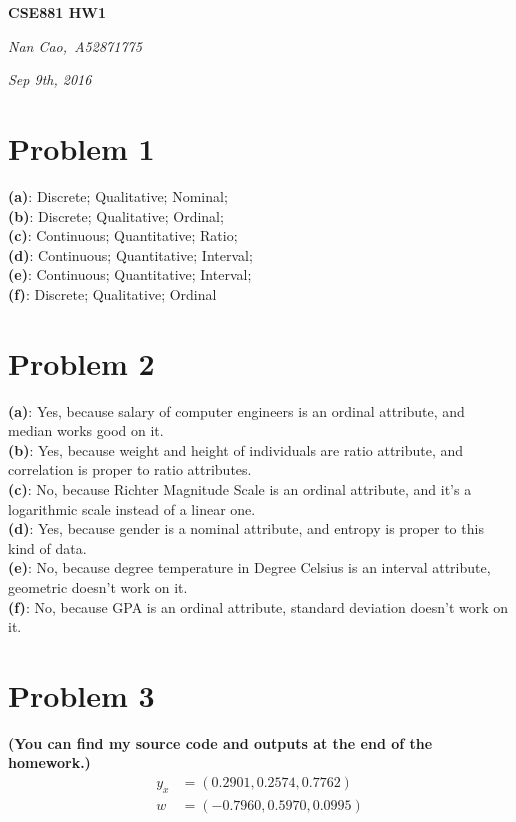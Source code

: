 \documentclass[11pt]{scrartcl}
\begin{document}
\centerline{\LARGE{\textbf{CSE881 HW1}}}
\centerline{\large{\textit{Nan Cao,\  A52871775}}}
\centerline{\large{\textit{Sep 9th, 2016}}}
\section*{Problem 1}
\textbf{(a)}: Discrete; Qualitative; Nominal;\\
\textbf{(b)}: Discrete; Qualitative; Ordinal;\\ 
\textbf{(c)}: Continuous; Quantitative; Ratio;\\
\textbf{(d)}: Continuous; Quantitative; Interval;\\
\textbf{(e)}: Continuous; Quantitative; Interval;\\
\textbf{(f)}: Discrete; Qualitative; Ordinal\\
\section*{Problem 2}
\textbf{(a)}: Yes, because salary of computer engineers is an ordinal attribute, and median works good on it.\\
\textbf{(b)}: Yes, because weight and height of individuals are ratio attribute, and correlation is proper to ratio attributes.\\ 
\textbf{(c)}: No, because Richter Magnitude Scale is an ordinal attribute, and it's a logarithmic scale instead of a linear one. \\
\textbf{(d)}: Yes, because gender is a nominal attribute, and entropy is proper to this kind of data.\\
\textbf{(e)}: No, because degree temperature in Degree Celsius is an interval attribute, geometric doesn't work on it. \\
\textbf{(f)}: No, because GPA is an ordinal attribute, standard deviation doesn't work on it.\\
\section*{Problem 3}
\textbf{(You can find my source code and outputs at the end of the homework.)}
\begin{equation*}
\begin{aligned}
y_x&=(0.2901,  0.2574, 0.7762)\\
w&=(-0.7960, 0.5970,0.0995)
\end{aligned}
\end{equation*}
\end{document}
